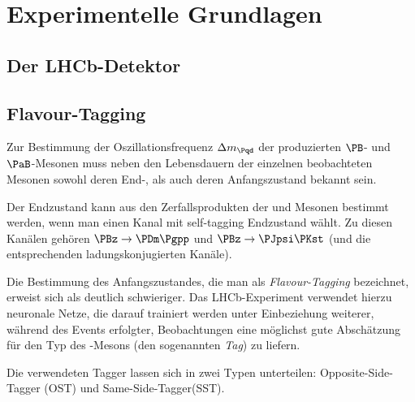 
\section{Experimentelle Grundlagen}


\subsection{Der LHCb-Detektor}


\subsection{Flavour-Tagging}

Zur Bestimmung der Oszillationsfrequenz $\difference{m_{\Pqd}}$ der produzierten $\PB$- und $\PaB$-Mesonen muss neben den Lebensdauern der einzelnen beobachteten Mesonen sowohl deren End-, als auch deren Anfangszustand bekannt sein.

Der Endzustand kann aus den Zerfallsprodukten der \PBz und \PaBz Mesonen bestimmt werden, wenn man einen Kanal mit self-tagging Endzustand wählt.
Zu diesen Kanälen gehören $\PBz \to \PDm \Pgpp$ und $\PBz \to \PJpsi \PKst$ (und die entsprechenden ladungskonjugierten Kanäle).

Die Bestimmung des Anfangszustandes, die man als \emph{Flavour-Tagging} bezeichnet, erweist sich als deutlich schwieriger.
Das LHCb-Experiment verwendet hierzu neuronale Netze, die darauf trainiert werden unter Einbeziehung weiterer, während des Events erfolgter, Beobachtungen eine möglichst gute Abschätzung für den Typ des \PB-Mesons (den sogenannten \emph{Tag}) zu liefern. %

Die verwendeten Tagger lassen sich in zwei Typen unterteilen: Opposite-Side-Tagger (OST) und Same-Side-Tagger(SST).

